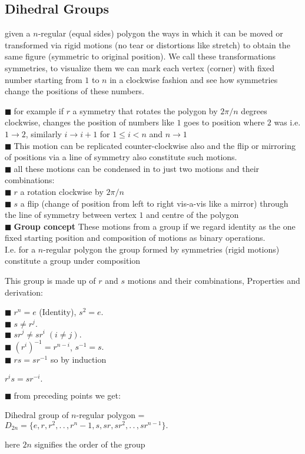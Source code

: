 \documentclass[11pt]{extarticle}
\newcommand{\ra}{\rightarrow}
\newcommand{\ck}{.\,.\,}
\newcommand{\y}{$\blacksquare\;$}
\newcommand{\tbx}[2][]{
	\begin{tcolorbox}[enhanced,breakable,size=small,colback=black!2!white,title={#1},arc is angular, arc=1.5mm,drop fuzzy shadow]
		#2
	\end{tcolorbox}
}
\begin{document}
\begin{multicols}{2}
	\subsection{Dihedral Groups}
	
	\tbx[Motivation]{\footnotesize 
		given a $n$-regular (equal sides) polygon the ways in which it can be moved
		or transformed via rigid motions (no tear or distortions like stretch) to obtain the same 
		figure (symmetric to original position). We call these transformations symmetries, to 
		visualize them we can mark each vertex (corner) with fixed number starting from $1$ to $n$ 
		in a clockwise fashion and see how symmetries change the positions of these numbers.
		
			\y  for example if $r$ a symmetry that rotates the polygon by $2\pi/n$ degrees clockwise,  
			changes the position of numbers like $ 1$ goes to position where $2$ was i.e. $1\ra 2$,
			similarly $i\ra i+1$ for $1\leq i<n$ and $n\ra 1$ \\
			\y  This motion can be replicated counter-clockwise also and the flip or mirroring of  
			positions via a line of symmetry also constitute such motions.\\
			\y  all these motions can be condensed in to just two motions and their combinations: \\
			\y  $r$ a rotation clockwise by $2\pi/n$ \\
			\y  $s$ a flip (change of position from left to right vis-a-vis like a mirror) through 
			the line of symmetry between vertex $1$ and centre of the polygon \\
	\y \textbf{Group concept} These motions from a group if we regard identity as the one fixed starting position and 
		composition of motions as binary operations.\\
		 I.e. for a $n$-regular polygon the group formed by symmetries (rigid motions)
		constitute a group under composition}
	\tbx{This group is made up of $r$ and $s$ motions and their combinations, Properties and 
		derivation:
		
			\y  $r^n=e$ (Identity), $s^2=e.$ \\
			\y  $s\neq r^j$. \\
			\y  $sr^j\neq sr^i\; (i\neq j).$ \\
			\y  $(r^i)^{-1}=r^{n-i}$, $s^{-1}=s.$ \\
			\y  $rs=sr^{-1}$ so by induction 
			\begin{center}
				$r^is=sr^{-i}.$
			\end{center}
			\y  from preceding points we get: 
			\begin{center}
				Dihedral group of $n$-regular polygon = \\
				$D_{2n}=\{e,r,r^2,\ck,r^n-1,s,sr,sr^2,\ck,sr^{n-1}\}.$
			\end{center} here $2n$ signifies the order of the group 	}
		

\end{multicols}
\end{document}
